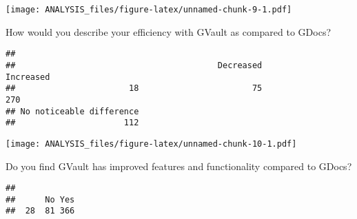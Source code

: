 \documentclass[]{article}
\newenvironment{Shaded}{\begin{snugshade}}{\end{snugshade}}
\newcommand{\KeywordTok}[1]{\textcolor[rgb]{0.13,0.29,0.53}{\textbf{#1}}}
\newcommand{\DataTypeTok}[1]{\textcolor[rgb]{0.13,0.29,0.53}{#1}}
\newcommand{\DecValTok}[1]{\textcolor[rgb]{0.00,0.00,0.81}{#1}}
\newcommand{\FloatTok}[1]{\textcolor[rgb]{0.00,0.00,0.81}{#1}}
\newcommand{\StringTok}[1]{\textcolor[rgb]{0.31,0.60,0.02}{#1}}
\newcommand{\OperatorTok}[1]{\textcolor[rgb]{0.81,0.36,0.00}{\textbf{#1}}}
\newcommand{\NormalTok}[1]{#1}
\begin{document}
\texttt{[image: ANALYSIS\_files/figure-latex/unnamed-chunk-9-1.pdf]}

How would you describe your efficiency with GVault as compared to GDocs?

\begin{Shaded}
\end{Shaded}

\begin{verbatim}
## 
##                                         Decreased                Increased 
##                       18                       75                      270 
## No noticeable difference 
##                      112
\end{verbatim}

\begin{Shaded}
\end{Shaded}

\texttt{[image: ANALYSIS\_files/figure-latex/unnamed-chunk-10-1.pdf]}

Do you find GVault has improved features and functionality compared to
GDocs?

\begin{Shaded}
\end{Shaded}

\begin{verbatim}
## 
##      No Yes 
##  28  81 366
\end{verbatim}

\begin{Shaded}
\end{Shaded}
\end{document}
